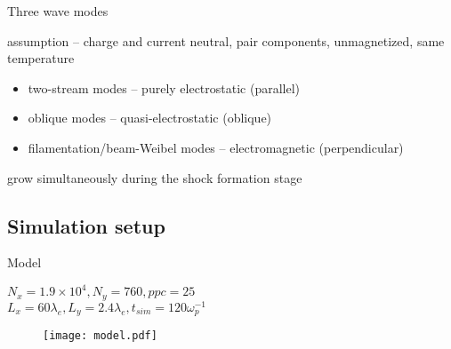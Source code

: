 \documentclass[10pt]{beamer}
\begin{document}
\begin{frame}[fragile]{Three wave modes}
  
  assumption -- charge and current neutral, pair components, unmagnetized, same temperature
  \begin{itemize}
  \item two-stream modes -- purely electrostatic (parallel)
  \item oblique modes -- quasi-electrostatic (oblique)
  \item filamentation/beam-Weibel modes -- electromagnetic (perpendicular)
  \end{itemize}
  grow simultaneously during the shock formation stage 
  
\end{frame}


\subsection{Simulation setup}

\begin{frame}{Model}
  
  \begin{center}
    $N_x = 1.9\times 10^4, N_y = 760, ppc = 25$ \\
    $L_x = 60 \lambda_e, L_y = 2.4 \lambda_e, t_{sim} = 120 \omega_p^{-1}$
  \end{center}
  
  \begin{figure}
    \texttt{[image: model.pdf]}
  \end{figure}
  

\end{frame}
\end{document}
